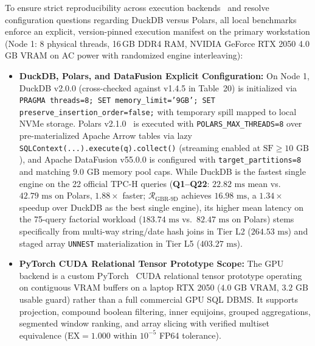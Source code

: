 \documentclass[10pt,a4paper]{article}
\begin{document}
To ensure strict reproducibility across execution backends~\cite{raasveldt2018fair} and resolve configuration questions regarding DuckDB versus Polars, all local benchmarks enforce an explicit, version-pinned execution manifest on the primary workstation (Node 1: 8 physical threads, 16\,GB DDR4 RAM, NVIDIA GeForce RTX 2050 4.0\,GB VRAM on AC power with randomized engine interleaving):
\begin{itemize}
    \item \textbf{DuckDB, Polars, and DataFusion Explicit Configuration:} On Node 1, DuckDB v2.0.0 (cross-checked against v1.4.5 in Table~20) is initialized via \texttt{PRAGMA threads=8; SET memory\_limit='9GB'; SET preserve\_insertion\_order=false;} with temporary spill mapped to local NVMe storage. Polars v2.1.0~\cite{vink2024polars} is executed with \texttt{POLARS\_MAX\_THREADS=8} over pre-materialized Apache Arrow tables via lazy \texttt{SQLContext(...).execute(q).collect()} (streaming enabled at $\text{SF}\ge 10\text{ GB}$), and Apache DataFusion v55.0.0 is configured with \texttt{target\_partitions=8} and matching $9.0\text{ GB}$ memory pool caps. While DuckDB is the fastest single engine on the 22 official TPC-H queries (\textbf{Q1--Q22}: $22.82\text{ ms}$ mean vs.\ $42.79\text{ ms}$ on Polars, $1.88\times$ faster; $\mathcal{R}_{\text{GBR-9D}}$ achieves $16.98\text{ ms}$, a $1.34\times$ speedup over DuckDB as the best single engine), its higher mean latency on the 75-query factorial workload ($183.74\text{ ms}$ vs.\ $82.47\text{ ms}$ on Polars) stems specifically from multi-way string/date hash joins in Tier L2 ($264.53\text{ ms}$) and staged array \texttt{UNNEST} materialization in Tier L5 ($403.27\text{ ms}$).
    \item \textbf{PyTorch CUDA Relational Tensor Prototype Scope:} The GPU backend is a custom PyTorch~\cite{paszke2019pytorch} CUDA relational tensor prototype operating on contiguous VRAM buffers on a laptop RTX 2050 ($4.0\text{ GB}$ VRAM, $3.2\text{ GB}$ usable guard) rather than a full commercial GPU SQL DBMS. It supports projection, compound boolean filtering, inner equijoins, grouped aggregations, segmented window ranking, and array slicing with verified multiset equivalence ($\text{EX}=1.000$ within $10^{-5}$ FP64 tolerance).

\end{itemize}
\end{document}
